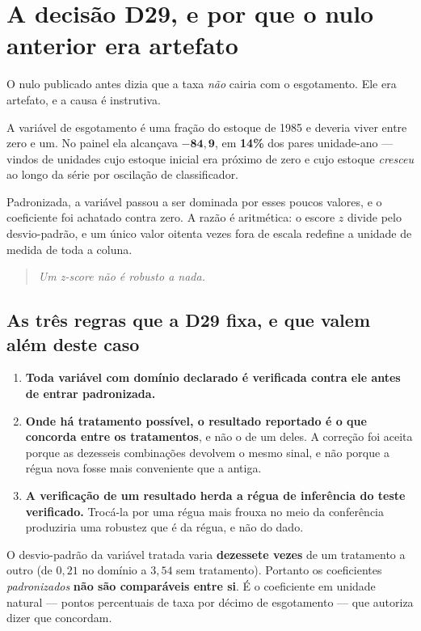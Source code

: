 \section{A decisão D29, e por que o nulo anterior era artefato}

O nulo publicado antes dizia que a taxa \emph{não} cairia com o esgotamento.
Ele era artefato, e a causa é instrutiva.

A variável de esgotamento é uma fração do estoque de 1985 e deveria viver entre
zero e um. No painel ela alcançava $\mathbf{-84{,}9}$, em \textbf{14\%} dos
pares unidade-ano --- vindos de unidades cujo estoque inicial era próximo de
zero e cujo estoque \emph{cresceu} ao longo da série por oscilação de
classificador.

Padronizada, a variável passou a ser dominada por esses poucos valores, e o
coeficiente foi achatado contra zero. A razão é aritmética: o escore $z$ divide
pelo desvio-padrão, e um único valor oitenta vezes fora de escala redefine a
unidade de medida de toda a coluna.

\begin{quote}\itshape\color{cortinta}
Um z-score não é robusto a nada.
\end{quote}

\subsection{As três regras que a D29 fixa, e que valem além deste caso}

\begin{enumerate}
\item \textbf{Toda variável com domínio declarado é verificada contra ele antes
de entrar padronizada.}
\item \textbf{Onde há tratamento possível, o resultado reportado é o que
concorda entre os tratamentos}, e não o de um deles. A correção foi aceita
porque as dezesseis combinações devolvem o mesmo sinal, e não porque a régua
nova fosse mais conveniente que a antiga.
\item \textbf{A verificação de um resultado herda a régua de inferência do teste
verificado.} Trocá-la por uma régua mais frouxa no meio da conferência
produziria uma robustez que é da régua, e não do dado.
\end{enumerate}

\begin{armadilha}
O desvio-padrão da variável tratada varia \textbf{dezessete vezes} de um
tratamento a outro (de $0{,}21$ no domínio a $3{,}54$ sem tratamento). Portanto
os coeficientes \emph{padronizados} \textbf{não são comparáveis entre si}. É o
coeficiente em unidade natural --- pontos percentuais de taxa por décimo de
esgotamento --- que autoriza dizer que concordam.
\end{armadilha}

